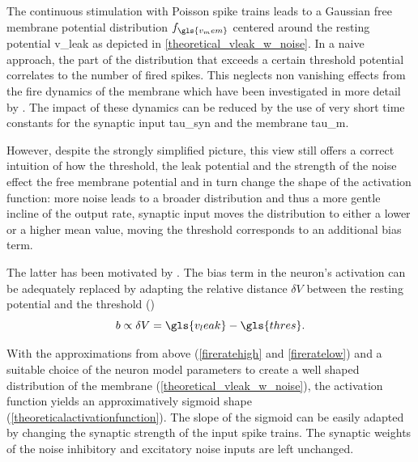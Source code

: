The continuous stimulation with Poisson spike trains leads to a Gaussian free membrane potential distribution $f_{\gls{v_mem}}$ centered around the resting potential \gls{v_leak} as depicted in \cref{theoretical_vleak_w_noise}. In a naive approach, the part of the distribution that exceeds a certain threshold potential correlates to the number of fired spikes. This neglects non vanishing effects from the fire dynamics of the membrane which have been investigated in more detail by \citealp{petrovici12phdthesis}. The impact of these dynamics can be reduced by the use of very short time constants for the synaptic input \gls{tau_syn} and the membrane \gls{tau_m}.

However, despite the strongly simplified picture, this view still offers a correct intuition of how the threshold, the leak potential and the strength of the noise effect the free membrane potential and in turn change the shape of the activation function: more noise leads to a broader distribution and thus a more gentle incline of the output rate, synaptic input moves the distribution to either a lower or a higher mean value, moving the threshold corresponds to an additional bias term.

The latter has been motivated by \citealp{petrovici2016stochastic}. The bias term in the neuron's activation can be adequately replaced by adapting the relative distance $\delta V$ between the resting potential and the threshold (\citealp{petrovici2016stochastic})
\begin{equation}
b \propto \delta V = \gls{v_leak} - \gls{thres}.
\end{equation}

With the approximations from above (\cref{fireratehigh} and \cref{fireratelow}) and a suitable choice of the neuron model parameters to create a well shaped distribution of the membrane (\cref{theoretical_vleak_w_noise}), the activation function yields an approximatively sigmoid shape (\cref{theoreticalactivationfunction}). The slope of the sigmoid can be easily adapted by changing the synaptic strength of the input spike trains. The synaptic weights of the noise inhibitory and excitatory noise inputs are left unchanged.

